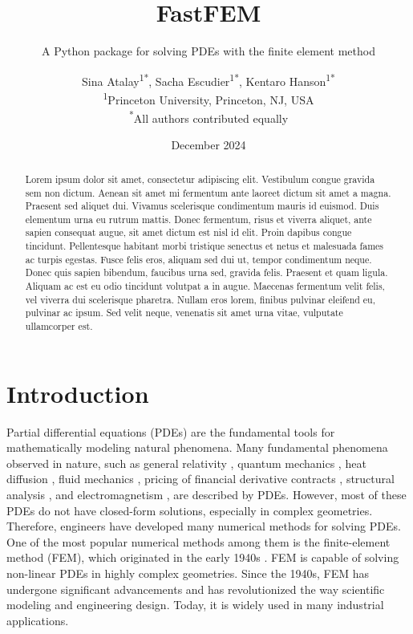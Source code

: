 \documentclass[headings=standardclasses, abstract=true]{scrartcl}
\title{FastFEM}
\subtitle{A Python package for solving PDEs with the finite element method}
\author{
    Sina Atalay\textsuperscript{1*}, Sacha Escudier\textsuperscript{1*}, Kentaro Hanson\textsuperscript{1*} \\
    {\footnotesize \textsuperscript{1}Princeton University, Princeton, NJ, USA}\\
    {\footnotesize \textsuperscript{*}All authors contributed equally}
}
\date{
    \normalsize December 2024
}
\begin{document}
\maketitle

\begin{abstract}
\noindent Lorem ipsum dolor sit amet, consectetur adipiscing elit. Vestibulum congue gravida sem non dictum. Aenean sit amet mi fermentum ante laoreet dictum sit amet a magna. Praesent sed aliquet dui. Vivamus scelerisque condimentum mauris id euismod. Duis elementum urna eu rutrum mattis. Donec fermentum, risus et viverra aliquet, ante sapien consequat augue, sit amet dictum est nisl id elit. Proin dapibus congue tincidunt. Pellentesque habitant morbi tristique senectus et netus et malesuada fames ac turpis egestas. Fusce felis eros, aliquam sed dui ut, tempor condimentum neque. Donec quis sapien bibendum, faucibus urna sed, gravida felis. Praesent et quam ligula. Aliquam ac est eu odio tincidunt volutpat a in augue. Maecenas fermentum velit felis, vel viverra dui scelerisque pharetra. Nullam eros lorem, finibus pulvinar eleifend eu, pulvinar ac ipsum. Sed velit neque, venenatis sit amet urna vitae, vulputate ullamcorper est.
\end{abstract}

\section{Introduction}

Partial differential equations (PDEs) are the fundamental tools for mathematically modeling natural phenomena. Many fundamental phenomena observed in nature, such as general relativity \cite{Marolf2001}, quantum mechanics \cite{Feit1982}, heat diffusion \cite{Bergman2011}, fluid mechanics \cite{Lukaszewicz2016}, pricing of financial derivative contracts \cite{Barles1998}, structural analysis \cite{Boresi2002}, and electromagnetism \cite{Griffiths2017}, are described by PDEs. However, most of these PDEs do not have closed-form solutions, especially in complex geometries. Therefore, engineers have developed many numerical methods for solving PDEs. One of the most popular numerical methods among them is the finite-element method (FEM), which originated in the early 1940s \cite{Liu2022}. FEM is capable of solving non-linear PDEs in highly complex geometries. Since the 1940s, FEM has undergone significant advancements and has revolutionized the way scientific modeling and engineering design. Today, it is widely used in many industrial applications.
\end{document}
